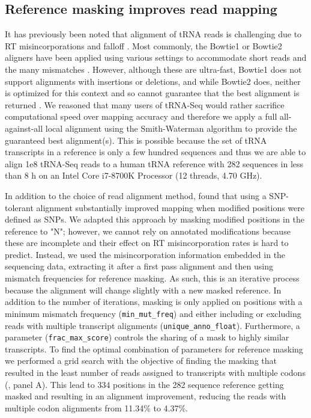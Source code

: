 \documentclass[9pt,lineno]{elife}
\begin{document}
\subsection{Reference masking improves read mapping}
It has previously been noted that alignment of tRNA reads is challenging due to RT misincorporations and falloff \citep{Hoffmann2018-uz, Behrens2021-gb}.
Most commonly, the Bowtie1 or Bowtie2 aligners have been applied using various settings to accommodate short reads and the many mismatches \citep{Cozen2015-cx, Zheng2015-kj, Clark2016-ph, Evans2017-st, Pinkard2020-yd}.
However, although these are ultra-fast, Bowtie1 does not support alignments with insertions or deletions, and while Bowtie2 does, neither is optimized for this context and so cannot guarantee that the best alignment is returned \citep{Langmead2009-yx, Langmead2012-ui}.
We reasoned that many users of tRNA-Seq would rather sacrifice computational speed over mapping accuracy and therefore we apply a full all-against-all local alignment using the Smith-Waterman algorithm to provide the guaranteed best alignment(s).
This is possible because the set of tRNA transcripts in a reference is only a few hundred sequences and thus we are able to align 1e8 tRNA-Seq reads to a human tRNA reference with 282 sequences in less than 8 h on an Intel Core i7-8700K Processor (12 threads, 4.70 GHz).

In addition to the choice of read alignment method, \cite{Behrens2021-gb} found that using a SNP-tolerant alignment substantially improved mapping when modified positions were defined as SNPs.
We adapted this approach by masking modified positions in the reference to "N"; however, we cannot rely on annotated modifications because these are incomplete and their effect on RT misincorporation rates is hard to predict.
Instead, we used the misincorporation information embedded in the sequencing data, extracting it after a first pass alignment and then using mismatch frequencies for reference masking.
As such, this is an iterative process because the alignment will change slightly with a new masked reference.
In addition to the number of iterations, masking is only applied on positions with a minimum mismatch frequency (\verb|min_mut_freq|) and either including or excluding reads with multiple transcript alignments (\verb|unique_anno_float|).
Furthermore, a parameter (\verb|frac_max_score|) controls the sharing of a mask to  highly similar transcripts.
To find the optimal combination of parameters for reference masking we performed a grid search with the objective of finding the masking that resulted in the least number of reads assigned to transcripts with multiple codons (, panel A).
This lead to 334 positions in the 282 sequence reference getting masked and resulting in an alignment improvement, reducing the reads with multiple codon alignments from 11.34\% to 4.37\%.
\end{document}

